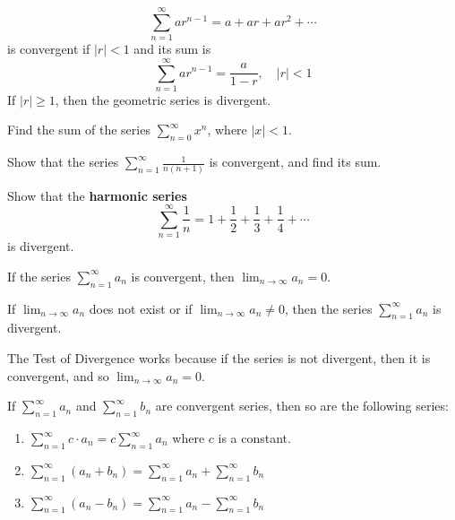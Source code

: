\[\sum_{n=1}^\infty ar^{n-1}=a+ar+ar^2+\cdots\]
is convergent if \(|r|<1\) and
its sum is
\[\sum_{n=1}^\infty ar^{n-1}=\frac{a}{1-r},\quad|r|<1\]
If \(|r|\geq 1\), then the geometric series is divergent.
\begin{problem}
    Find the sum of the series \(\displaystyle{\sum_{n=0}^\infty x^n}\), where
    \(|x|<1\).
\end{problem}
\begin{solution}
    
\end{solution}
\begin{problem}
    Show that the series \(\displaystyle{\sum_{n=1}^\infty}\frac{1}{n(n+1)}\)
    is convergent, and find its sum.
\end{problem}
\begin{solution}
    
\end{solution}
\begin{problem}
    Show that the \textbf{harmonic series}
    \[\sum_{n=1}^\infty \frac{1}{n}=1+\frac{1}{2}+\frac{1}{3}+\frac{1}{4}
    +\cdots\]
    is divergent.
\end{problem}
\begin{solution}
    
\end{solution}

\begin{theorem}
    If the series \(\displaystyle{\sum_{n=1}^\infty a_n}\) is convergent, then
    \(\displaystyle{\lim_{n\to\infty}a_n=0}\).
\end{theorem}
\begin{theorem}
    If \(\displaystyle{\lim_{n\to\infty}a_n}\) does not exist or if
    \(\displaystyle{\lim_{n\to\infty}a_n\neq 0}\), then the series
    \(\displaystyle{\sum_{n=1}^\infty a_n}\) is divergent.
\end{theorem}
The Test of Divergence works because if the series is not divergent, then it
is convergent, and so \(\displaystyle{\lim_{n\to\infty}a_n=0}\).
\begin{theorem}
    If \(\displaystyle{\sum_{n=1}^\infty a_n}\) and
    \(\displaystyle{\sum_{n=1}^\infty b_n}\) are convergent series, then so
    are the following series:
    \begin{enumerate}
        \item
        \(\displaystyle{\sum_{n=1}^\infty c\cdot a_n
        =c\sum_{n=1}^\infty a_n}\) where \(c\) is a constant.
        \item
        \(\displaystyle{\sum_{n=1}^\infty(a_n+b_n)
        =\sum_{n=1}^\infty a_n+\sum_{n=1}^\infty b_n}\)
        \item
        \(\displaystyle{\sum_{n=1}^\infty(a_n-b_n)
        =\sum_{n=1}^\infty a_n-\sum_{n=1}^\infty b_n}\)
    \end{enumerate}
\end{theorem}